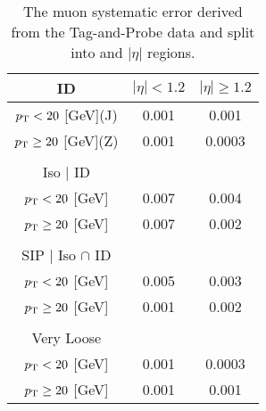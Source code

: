 \begin{table}[htbp]
\centering
\caption{The muon systematic error derived from the Tag-and-Probe data and split into \pt and $|\eta|$ regions. }
\label{tab:musysttable}
\begin{tabular}{|c|cc|}
\hline
\hline
ID & $|\eta|<1.2$ & $|\eta|\geq 1.2$  \\
\hline
$p_{\mathrm{T}} < 20$ [GeV](J) & 0.001 & 0.001  \\

$p_{\mathrm{T}} \geq 20$ [GeV](Z) &  0.001& 0.0003 \\

 &  & \\
\hline
Iso $|$ ID  &  &  \\
\hline
$p_{\mathrm{T}} < 20$ [GeV]  & 0.007 & 0.004  \\

$p_{\mathrm{T}} \geq 20$ [GeV] & 0.007 & 0.002  \\

 &  &  \\
\hline
SIP $|$ Iso $\cap$ ID &  &  \\
\hline
$p_{\mathrm{T}} < 20$ [GeV]& 0.005 & 0.003 \\

$p_{\mathrm{T}} \geq 20$ [GeV]& 0.001 & 0.002 \\
 & &  \\
\hline
Very Loose & &  \\
\hline
$p_{\mathrm{T}} < 20 $ [GeV]  & 0.001 & 0.0003 \\
$p_{\mathrm{T}} \geq 20$ [GeV]  & 0.001 & 0.001 \\
\hline
\end{tabular}
\label{tab:musyst}
\end{table}


